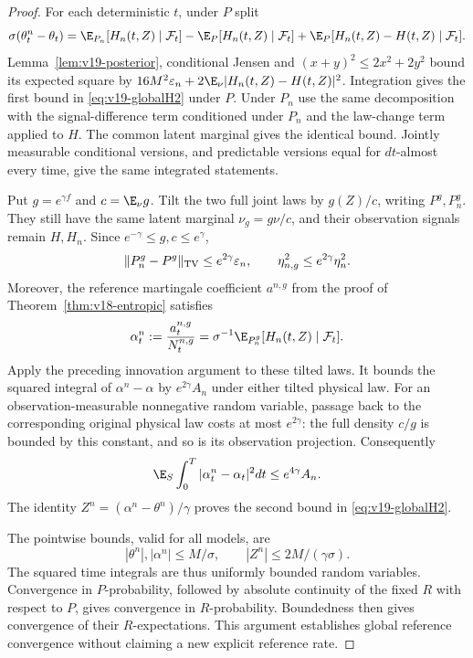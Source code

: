 \begin{proof}
For each deterministic $t$, under $P$ split
\[
 \sigma(\theta_t^n-\theta_t)
 =\E_{P_n}[H_n(t,Z)\mid\mathcal F_t]
      -\E_P[H_n(t,Z)\mid\mathcal F_t]
      +\E_P[H_n(t,Z)-H(t,Z)\mid\mathcal F_t].
\]
Lemma~\ref{lem:v19-posterior}, conditional Jensen and
$(x+y)^2\le2x^2+2y^2$ bound its expected square by
$16M^2\varepsilon_n+2\E_\nu|H_n(t,Z)-H(t,Z)|^2$.
Integration gives the first bound in \eqref{eq:v19-globalH2} under $P$.
Under $P_n$ use the same decomposition with the signal-difference term
conditioned under $P_n$ and the law-change term applied to $H$. The common
latent marginal gives the identical bound. Jointly measurable conditional
versions, and predictable versions equal for $dt$-almost every time, give
the same integrated statements.

Put $g=e^{\gamma f}$ and $c=\E_\nu g$. Tilt the two full joint laws by
$g(Z)/c$, writing $P^g,P_n^g$. They still have the same latent marginal
$\nu_g=g\nu/c$, and their observation signals remain $H,H_n$. Since
$e^{-\gamma}\le g,c\le e^\gamma$,
\[
 \|P_n^g-P^g\|_{\rm TV}\le e^{2\gamma}\varepsilon_n,
 \qquad \eta_{n,g}^2\le e^{2\gamma}\eta_n^2.
\]
Moreover, the reference martingale coefficient $a^{n,g}$ from the proof
of Theorem~\ref{thm:v18-entropic} satisfies
\[
 \alpha_t^n:=\frac{a_t^{n,g}}{N_t^{n,g}}
       =\sigma^{-1}\E_{P_n^g}[H_n(t,Z)\mid\mathcal F_t].
\]
Apply the preceding innovation argument to these tilted laws. It bounds
the squared integral of $\alpha^n-\alpha$ by $e^{2\gamma}A_n$ under
either tilted physical law. For an observation-measurable nonnegative
random variable, passage back to the corresponding original physical law
costs at most $e^{2\gamma}$: the full density $c/g$ is bounded by this
constant, and so is its observation projection. Consequently
\[
 \E_S\int_0^T|\alpha_t^n-\alpha_t|^2dt\le e^{4\gamma}A_n.
\]
The identity $Z^n=(\alpha^n-\theta^n)/\gamma$ proves the second bound
in \eqref{eq:v19-globalH2}.

The pointwise bounds, valid for all models, are
\begin{equation}\label{eq:v19-uniformcoefficients}
 |\theta^n|,|\alpha^n|\le M/\sigma,
 \qquad |Z^n|\le2M/(\gamma\sigma).
\end{equation}
The squared time integrals are thus uniformly bounded random variables.
Convergence in $P$-probability, followed by absolute continuity of the fixed
$R$ with respect to $P$, gives convergence in $R$-probability. Boundedness
then gives convergence of their $R$-expectations. This argument establishes
global reference convergence without claiming a new explicit reference rate.


\end{proof}
